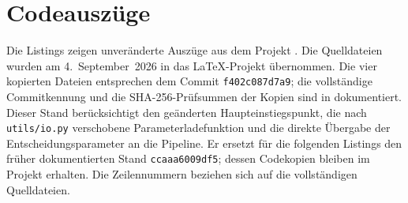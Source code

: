\begingroup
\raggedbottom
\chapter{Codeauszüge}
\label{app:codeauszuege}

\begingroup
\setlength{\emergencystretch}{1em}
Die Listings zeigen unveränderte Auszüge aus dem Projekt
. Die Quelldateien wurden am
4.~September~2026 in das LaTeX-Projekt übernommen. Die vier kopierten Dateien
entsprechen dem Commit \texttt{f402c087d7a9}; die vollständige Commitkennung
und die SHA-256-Prüfsummen der Kopien sind in
 dokumentiert. Dieser Stand
berücksichtigt den geänderten Haupteinstiegspunkt, die nach
\texttt{utils/io.py} verschobene Parameterladefunktion und die direkte
Übergabe der Entscheidungsparameter an die Pipeline. Er ersetzt für die
folgenden Listings den früher dokumentierten Stand \texttt{ccaaa6009df5};
dessen Codekopien bleiben im Projekt erhalten.
Die Zeilennummern beziehen sich auf die vollständigen Quelldateien.
\par\endgroup





\noindent\begin{minipage}{\textwidth}

\end{minipage}

\noindent\begin{minipage}{\textwidth}

\end{minipage}
\par\clearpage
\endgroup
